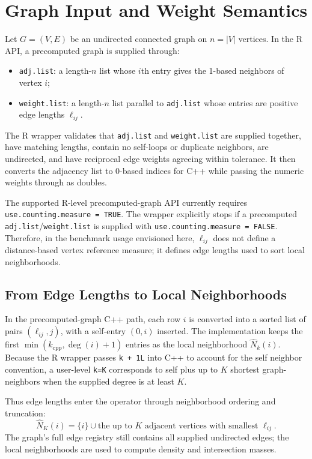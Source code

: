 \documentclass[11pt]{article}
\newcommand{\code}[1]{\texttt{#1}}
\begin{document}
\section{Graph Input and Weight Semantics}

Let \(G=(V,E)\) be an undirected connected graph on \(n=|V|\) vertices. In the
R API, a precomputed graph is supplied through:
\begin{itemize}[leftmargin=1.5em]
  \item \code{adj.list}: a length-\(n\) list whose \(i\)th entry gives the
  1-based neighbors of vertex \(i\);
  \item \code{weight.list}: a length-\(n\) list parallel to \code{adj.list}
  whose entries are positive edge lengths \(\ell_{ij}\).
\end{itemize}

The R wrapper validates that \code{adj.list} and \code{weight.list} are supplied
together, have matching lengths, contain no self-loops or duplicate neighbors,
are undirected, and have reciprocal edge weights agreeing within tolerance. It
then converts the adjacency list to 0-based indices for C++ while passing the
numeric weights through as doubles.

The supported R-level precomputed-graph API currently requires
\code{use.counting.measure = TRUE}. The wrapper explicitly stops if a
precomputed \code{adj.list}/\code{weight.list} is supplied with
\code{use.counting.measure = FALSE}. Therefore, in the benchmark usage
envisioned here, \(\ell_{ij}\) does not define a distance-based vertex reference
measure; it defines edge lengths used to sort local neighborhoods.

\subsection{From Edge Lengths to Local Neighborhoods}

In the precomputed-graph C++ path, each row \(i\) is converted into a sorted
list of pairs \((\ell_{ij},j)\), with a self-entry \((0,i)\) inserted. The
implementation keeps the first \(\min(k_{\mathrm{cpp}}, \deg(i)+1)\) entries
as the local neighborhood \(\widehat N_k(i)\). Because the R wrapper passes
\code{k + 1L} into C++ to account for the self neighbor convention, a user-level
\code{k=K} corresponds to self plus up to \(K\) shortest graph-neighbors when
the supplied degree is at least \(K\).

Thus edge lengths enter the operator through neighborhood ordering and
truncation:
\[
  \widehat N_K(i)
  =
  \{i\}\cup
  \text{the up to \(K\) adjacent vertices with smallest } \ell_{ij}.
\]
The graph's full edge registry still contains all supplied undirected edges;
the local neighborhoods are used to compute density and intersection masses.
\end{document}
